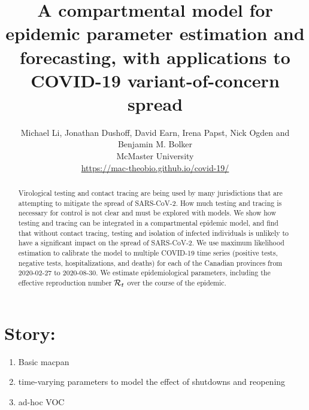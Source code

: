 \documentclass[12pt]{article}\usepackage[]{graphicx}\usepackage[]{color}
\title{A compartmental model for epidemic parameter estimation and forecasting, with applications to COVID-19 variant-of-concern spread}
\author{Michael Li, Jonathan Dushoff, David Earn, Irena Papst, Nick Ogden and Benjamin M. Bolker\\
  McMaster University\\
  \url{https://mac-theobio.github.io/covid-19/}
  }
\begin{document}
\linenumbers
\maketitle

\section*{Story:}
\begin{enumerate}
\item{Basic macpan}
\item{time-varying parameters to model the effect of shutdowns and reopening}
\item{ad-hoc VOC}
\end{enumerate}

\begin{abstract}
  Virological testing and contact tracing are being used by many
  jurisdictions that are attempting to mitigate the spread of
  SARS-CoV-2.  How much testing and tracing is necessary for control
  is not clear and must be explored with models.  We show how testing
  and tracing can be integrated in a compartmental epidemic model, and
  find that without contact tracing, testing and isolation of infected
  individuals is unlikely to have a significant impact on the spread
  of SARS-CoV-2.  We use maximum likelihood estimation to calibrate
  the model to multiple COVID-19 time series (positive tests, negative
  tests, hospitalizations, and deaths) for each of the Canadian
  provinces from 2020-02-27 to 2020-08-30.  We
  estimate epidemiological parameters, including the effective
  reproduction number ${\mathcal R}_t$ over the course of the epidemic.
\end{abstract}

\end{document}
